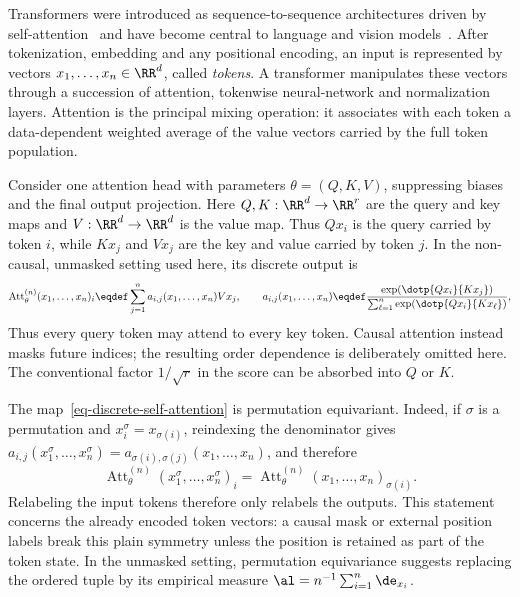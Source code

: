 Transformers were introduced as sequence-to-sequence architectures driven by self-attention~\cite{Vaswani2017Attention} and have become central to language and vision models~\cite{Brown2020LanguageModels,Dosovitskiy2021Image}. After tokenization, embedding and any positional encoding, an input is represented by vectors \(x_1,\ldots,x_n\in\RR^d\), called \emph{tokens}. A transformer manipulates these vectors through a succession of attention, tokenwise neural-network and normalization layers. Attention is the principal mixing operation: it associates with each token a data-dependent weighted average of the value vectors carried by the full token population.

Consider one attention head with parameters \(\theta=(Q,K,V)\), suppressing biases and the final output projection. Here \(Q,K:\RR^d\to\RR^r\) are the query and key maps and \(V:\RR^d\to\RR^d\) is the value map. Thus \(Qx_i\) is the query carried by token \(i\), while \(Kx_j\) and \(Vx_j\) are the key and value carried by token \(j\). In the non-causal, unmasked setting used here, its discrete output is
\begin{equation}\label{eq-discrete-self-attention}
	\operatorname{Att}^{(n)}_\theta(x_1,\ldots,x_n)_i
	\eqdef
	\sum_{j=1}^n a_{i,j}(x_1,\ldots,x_n)Vx_j,
	\qquad
	a_{i,j}(x_1,\ldots,x_n)
	\eqdef
	\frac{\exp(\dotp{Qx_i}{Kx_j})}
	{\sum_{\ell=1}^n\exp(\dotp{Qx_i}{Kx_\ell})},
\end{equation}
Thus every query token may attend to every key token. Causal attention instead masks future indices; the resulting order dependence is deliberately omitted here. The conventional factor \(1/\sqrt r\) in the score can be absorbed into \(Q\) or \(K\).

The map~\eqref{eq-discrete-self-attention} is permutation equivariant. Indeed, if \(\sigma\) is a permutation and \(x_i^\sigma=x_{\sigma(i)}\), reindexing the denominator gives \(a_{i,j}(x_1^\sigma,\ldots,x_n^\sigma)=a_{\sigma(i),\sigma(j)}(x_1,\ldots,x_n)\), and therefore
\[
	\operatorname{Att}^{(n)}_\theta(x_1^\sigma,\ldots,x_n^\sigma)_i
	=
	\operatorname{Att}^{(n)}_\theta(x_1,\ldots,x_n)_{\sigma(i)}.
\]
Relabeling the input tokens therefore only relabels the outputs. This statement concerns the already encoded token vectors: a causal mask or external position labels break this plain symmetry unless the position is retained as part of the token state. In the unmasked setting, permutation equivariance suggests replacing the ordered tuple by its empirical measure \(\al=n^{-1}\sum_{i=1}^n\de_{x_i}\).

